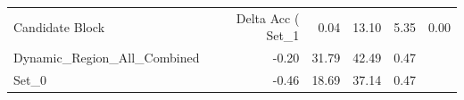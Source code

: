 \begin{tabular}{lrrrr}
\toprule
Candidate Block & Delta Acc (%
\midrule
Set_1 & 0.04 & 13.10 & 5.35 & 0.00 \\
Dynamic_Region_All_Combined & -0.20 & 31.79 & 42.49 & 0.47 \\
Set_0 & -0.46 & 18.69 & 37.14 & 0.47 \\
\bottomrule
\end{tabular}
